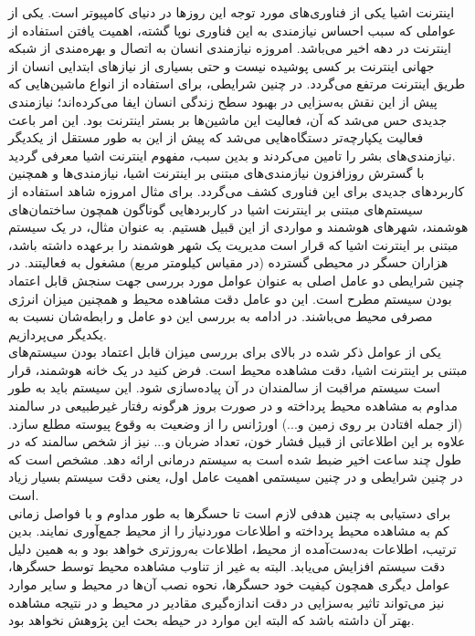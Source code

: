اینترنت اشیا یکی از فناوری‌های مورد توجه این روزها در دنیای کامپیوتر است. یکی از عواملی که سبب احساس نیازمندی به این فناوری نوپا گشته، اهمیت یافتن استفاده از اینترنت در دهه اخیر می‌باشد. امروزه نیازمندی انسان به اتصال و بهره‌مندی از شبکه جهانی اینترنت بر کسی پوشیده نیست و حتی بسیاری از نیازهای ابتدایی انسان از طریق اینترنت مرتفع می‌گردد. در چنین شرایطی، برای استفاده از انواع ماشین‌هایی که پیش از این نقش به‌سزایی در بهبود سطح زندگی انسان ایفا می‌کرده‌اند؛ نیازمندی جدیدی حس می‌شد که آن، فعالیت این ماشین‌ها بر بستر اینترنت بود. این امر باعث فعالیت یکپارچه‌تر دستگاه‌هایی می‌شد که پیش از این به طور مستقل از یکدیگر نیازمندی‌های بشر را تامین می‌کردند و بدین سبب، مفهوم اینترنت اشیا معرفی گردید.\\
با گسترش روزافزون نیازمندی‌های مبتنی بر اینترنت اشیا، نیازمندی‌ها و همچنین کاربردهای جدیدی برای این فناوری کشف می‌گردد. برای مثال امروزه شاهد استفاده از سیستم‌های مبتنی بر اینترنت اشیا در کاربرد‌هایی گوناگون همچون ساختمان‌های هوشمند، شهرهای هوشمند و مواردی از این قبیل هستیم. به عنوان مثال، در یک سیستم مبتنی بر اینترنت اشیا که قرار است مدیریت یک شهر هوشمند را برعهده داشته باشد، هزاران حسگر در محیطی گسترده (در مقیاس کیلومتر مربع) مشغول به فعالیتند. در چنین شرایطی دو عامل اصلی به عنوان عوامل مورد بررسی جهت سنجش قابل اعتماد بودن سیستم مطرح است. این دو عامل دقت مشاهده محیط و همچنین میزان انرژی مصرفی محیط می‌باشند. در ادامه به بررسی این دو عامل و رابطه‌شان نسبت به یکدیگر می‌پردازیم.\\
یکی از عوامل ذکر شده در بالای برای بررسی میزان قابل اعتماد بودن سیستم‌های مبتنی بر اینترنت اشیا، دقت مشاهده محیط است. فرض کنید در یک خانه هوشمند، قرار است سیستم مراقبت از سالمندان در آن پیاده‌سازی شود. این سیستم باید به طور مداوم به مشاهده محیط پرداخته و در صورت بروز هرگونه رفتار غیرطبیعی در سالمند (از جمله افتادن بر روی زمین و...) اورژانس را از وضعیت به وقوع پیوسته مطلع سازد. علاوه بر این اطلاعاتی از قبیل فشار خون، تعداد ضربان و... نیز از شخص سالمند که در طول چند ساعت اخیر ضبط شده است به سیستم درمانی ارائه دهد. مشخص است که در چنین شرایطی و در چنین سیستمی اهمیت عامل اول، یعنی دقت سیستم بسیار زیاد است.\\
برای دستیابی به چنین هدفی لازم است تا حسگرها به طور مداوم و با فواصل زمانی کم به مشاهده محیط پرداخته و اطلاعات موردنیاز را از محیط جمع‌آوری نمایند. بدین ترتیب، اطلاعات به‌دست‌آمده از محیط، اطلاعات به‌روزتری خواهد بود و به همین دلیل دقت سیستم افزایش می‌یابد. البته به غیر از تناوب مشاهده محیط توسط حسگر‌ها، عوامل دیگری همچون کیفیت خود حسگرها، نحوه نصب آن‌ها در محیط و سایر موارد نیز می‌تواند تاثیر به‌سزایی در دقت اندازه‌گیری مقادیر در محیط و در نتیجه مشاهده بهتر آن داشته باشد که البته این موارد در حیطه بحث این پژوهش نخواهد بود.\\
